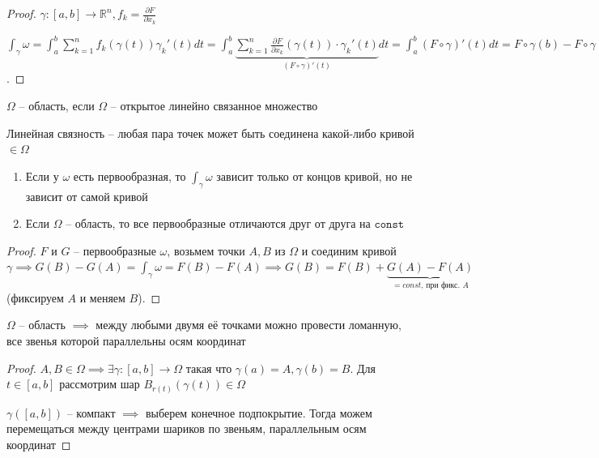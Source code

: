 \begin{proof}
    $\gamma: [a, b] \to \mathbb{R}^n, f_k = \frac{\partial F}{\partial x_k}$

    $\int_{\gamma}^{}\omega = \int_{a}^{b}\sum_{k = 1}^{n}f_k(\gamma(t))\gamma_k'(t) dt = \int_{a}^{b}\underbrace{\sum_{k = 1}^{n} \frac{\partial F}{\partial x_k}(\gamma(t)) \cdot \gamma_k'(t)}_{(F \circ \gamma)'(t)} dt = \int_{a}^{b}(F \circ \gamma)'(t) dt = F \circ \gamma(b) - F \circ \gamma(a) = F(\gamma(b)) - F(\gamma(a)) = F(B) - F(A)$.
\end{proof}

\begin{definition}
    $\Omega$ -- область, если $\Omega$ -- открытое линейно связанное множество

    Линейная связность -- любая пара точек может быть соединена какой-либо кривой $\in \Omega$
\end{definition}

\begin{consequence}
    \begin{enumerate}
        \item Если у $\omega$ есть первообразная, то $\int_{\gamma}^{}\omega$ зависит только от концов кривой, но не зависит от самой кривой
        \item Если $\Omega$ -- область, то все первообразные отличаются друг от друга на $\texttt{const}$
    \end{enumerate}
\end{consequence}

\begin{proof}
    \item[2.] $F$ и $G$ -- первообразные $\omega$, возьмем точки $A, B$ из $\Omega$ и соединим кривой $\gamma \implies G(B) - G(A) = \int_{\gamma}^{}\omega = F(B) - F(A) \implies G(B) = F(B) + \underbrace{G(A) - F(A)}_{=const \text{, при фикс. } A}$ (фиксируем $A$ и меняем $B$).
\end{proof}

\begin{lemma}
    $\Omega$ -- область $\implies$ между любыми двумя её точками можно провести ломанную, все звенья которой параллельны осям координат

\end{lemma}

\begin{proof}
    $A, B \in \Omega \implies \exists \gamma: [a, b] \to \Omega$ такая что $\gamma(a) = A, \gamma(b) = B$. Для $t \in [a, b]$ рассмотрим шар $B_{r(t)}(\gamma(t)) \in \Omega$
    

    $\gamma([a, b])$ -- компакт $\implies$ выберем конечное подпокрытие. Тогда можем перемещаться между центрами шариков по звеньям, параллельным осям координат

\end{proof}

